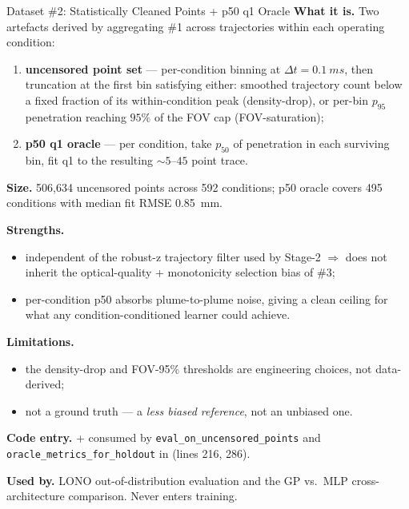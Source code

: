 \documentclass[UTF8,aspectratio=169]{ctexbeamer}
\newcommand{\good}[1]{\textcolor{green!45!black}{#1}}
\newcommand{\warn}[1]{\textcolor{red!65!black}{#1}}
\begin{document}
\begin{frame}{Dataset \#2: Statistically Cleaned Points + p50 q1 Oracle}
\small
\textbf{What it is.} Two artefacts derived by aggregating \#1 across trajectories within each operating condition:
\begin{enumerate}\setlength\itemsep{1pt}
  \item \textbf{uncensored point set} --- per-condition binning at \(\Delta t = \SI{0.1}{ms}\), then truncation at the first bin satisfying either: smoothed trajectory count below a fixed fraction of its within-condition peak (density-drop), or per-bin \(p_{95}\) penetration reaching \(95\%\) of the FOV cap (FOV-saturation);
  \item \textbf{p50 q1 oracle} --- per condition, take \(p_{50}\) of penetration in each surviving bin, fit q1 to the resulting \(\sim 5\)--\(45\) point trace.
\end{enumerate}

\vspace{0.35em}
\textbf{Size.} 506{,}634 uncensored points across 592 conditions; p50 oracle covers 495 conditions with median fit RMSE \SI{0.85}{mm}.

\vspace{0.35em}
\textbf{Strengths.}
\begin{itemize}\setlength\itemsep{1.5pt}
  \item \good{independent of the robust-z trajectory filter} used by Stage-2 \(\Rightarrow\) does not inherit the optical-quality + monotonicity selection bias of \#3;
  \item per-condition p50 absorbs plume-to-plume noise, giving a clean ceiling for what any condition-conditioned learner could achieve.
\end{itemize}

\textbf{Limitations.}
\begin{itemize}\setlength\itemsep{1.5pt}
  \item the density-drop and FOV-95\% thresholds are engineering choices, not data-derived;
  \item not a ground truth --- a \emph{less biased reference}, not an unbiased one.
\end{itemize}

\vspace{0.35em}
\textbf{Code entry.}  +  consumed by \texttt{eval\_on\_uncensored\_points} and \texttt{oracle\_metrics\_for\_holdout} in  (lines 216, 286).

\textbf{Used by.} \good{LONO out-of-distribution evaluation} and the GP vs.\ MLP cross-architecture comparison. \warn{Never enters training.}
\end{frame}
\end{document}

